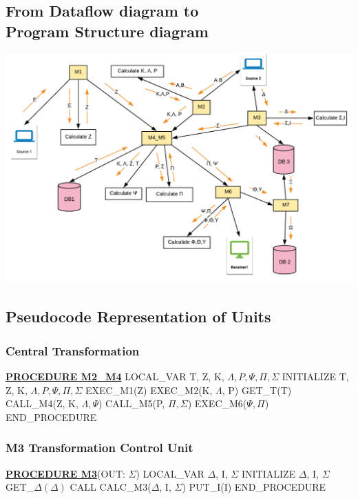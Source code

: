 \documentclass{article}
\begin{document}
\subsection{From Dataflow diagram to{\\} Program Structure diagram}
\includegraphics[scale=0.6]{program-structure}

\subsection{Pseudocode Representation of Units}

\subsubsection{Central Transformation}
\begin{algorithmic}[H]
\STATE \underline{\textbf{PROCEDURE M2\_M4}}
	\STATE LOCAL\_VAR T, Z, K, $\Lambda, P, \Psi, \Pi, \Sigma$ 
	\STATE INITIALIZE T, Z, K, $\Lambda, P, \Psi, \Pi, \Sigma$ 
	\STATE EXEC\_M1(Z)
	\STATE EXEC\_M2(K, $\Lambda$, P)
	\STATE GET\_T(T)
	\STATE CALL\_M4(Z, K, $\Lambda, \Psi$)
	\STATE CALL\_M5(P, $\Pi, \Sigma$)
	\STATE EXEC\_M6($\Psi, \Pi$)
\STATE END\_PROCEDURE
\end{algorithmic}

\subsubsection{M3 Transformation Control Unit}
\begin{algorithmic}[H]
\STATE \underline{\textbf{PROCEDURE M3}}(OUT: $\Sigma$)
	\STATE LOCAL\_VAR $\Delta$, I, $\Sigma$
	\STATE INITIALIZE $\Delta$, I, $\Sigma$ 
	\STATE GET\_$\Delta(\Delta)$
	\STATE CALL CALC\_M3($\Delta$, I, $\Sigma$)
	\STATE PUT\_I(I)
\STATE END\_PROCEDURE
\end{algorithmic}
\end{document}
